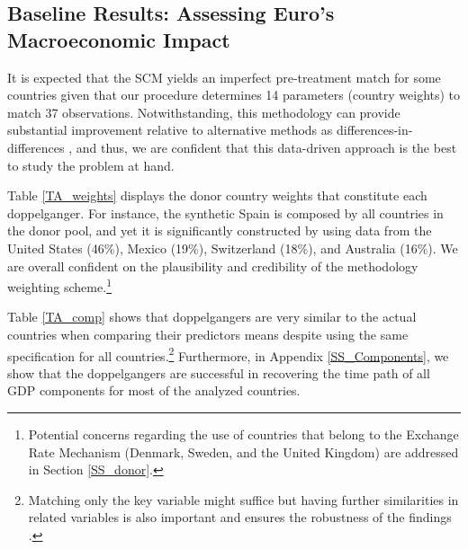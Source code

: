 \documentclass[12pt]{article}
\begin{document}
\subsection{Baseline Results: Assessing Euro's Macroeconomic Impact}

It is expected that the SCM yields an imperfect pre-treatment match for some countries given that our procedure determines 14 parameters (country weights) to match 37 observations. Notwithstanding, this methodology can provide substantial improvement relative to alternative methods as differences-in-differences \citep{Ferman2019}, and thus, we are confident that this data-driven approach is the best to study the problem at hand.

Table \ref{TA_weights} displays the donor country weights that constitute each doppelganger. For instance, the synthetic Spain is composed by all countries in the donor pool, and yet it is significantly constructed by using data from the United States (46\%), Mexico (19\%), Switzerland (18\%), and Australia (16\%). We are overall confident on the plausibility and credibility of the methodology weighting scheme.\footnote{Potential concerns regarding the use of countries that belong to the Exchange Rate Mechanism (Denmark, Sweden, and the United Kingdom) are addressed in Section \ref{SS_donor}.}

Table \ref{TA_comp} shows that doppelgangers are very similar to the actual countries when comparing their predictors means despite using the same specification for all countries.\footnote{Matching only the key variable might suffice but having further similarities in related variables is also important and ensures the robustness of the findings \cite{Botosaru2019}.} Furthermore, in Appendix \ref{SS_Components}, we show that the doppelgangers are successful in recovering the time path of all GDP components for most of the analyzed countries.
\end{document}
